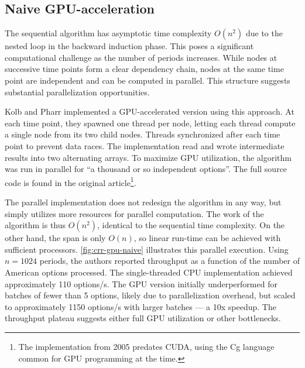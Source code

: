 \documentclass[english,12pt,a4paper,pdftex,sci,utf8]{aaltothesis}
\begin{document}
\subsection{Naive GPU-acceleration}
The sequential algorithm has asymptotic time complexity $O(n^2)$ due to the nested loop in the backward induction phase. This poses a significant computational challenge as the number of periods increases. While nodes at successive time points form a clear dependency chain, nodes at the same time point are independent and can be computed in parallel. This structure suggests substantial parallelization opportunities.

Kolb and Pharr \cite{pharr2005gpu} implemented a GPU-accelerated version using this approach. At each time point, they spawned one thread per node, letting each thread compute a single node from its two child nodes. Threads synchronized after each time point to prevent data races. The implementation read and wrote intermediate results into two alternating arrays. To maximize GPU utilization, the algorithm was run in parallel for ``a thousand or so independent options''. The full source code is found in the original article\footnote{The implementation from 2005 predates CUDA, using the Cg language common for GPU programming at the time.}.

The parallel implementation does not redesign the algorithm in any way, but simply utilizes more resources for parallel computation. The work of the algorithm is thus $O(n^2)$, identical to the sequential time complexity. On the other hand, the span is only $O(n)$, so linear run-time can be achieved with sufficient processors. \cref{fig:crr-gpu-naive} illustrates this parallel execution. Using $n=1024$ periods, the authors reported throughput as a function of the number of American options processed. The single-threaded CPU implementation achieved approximately 110 options/s. The GPU version initially underperformed for batches of fewer than 5 options, likely due to parallelization overhead, but scaled to approximately 1150 options/s with larger batches --- a 10x speedup. The throughput plateau suggests either full GPU utilization or other bottlenecks.
\end{document}
